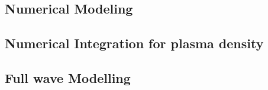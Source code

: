 \documentclass[11pt,a4paper]{report}
\begin{document}
\begin{multicols}{2}
    \chapter{Numerical Modeling}
    \section{Numerical Integration for plasma density}
    \section{Full wave Modelling}



\end{multicols}
\printbibliography
\end{document}
